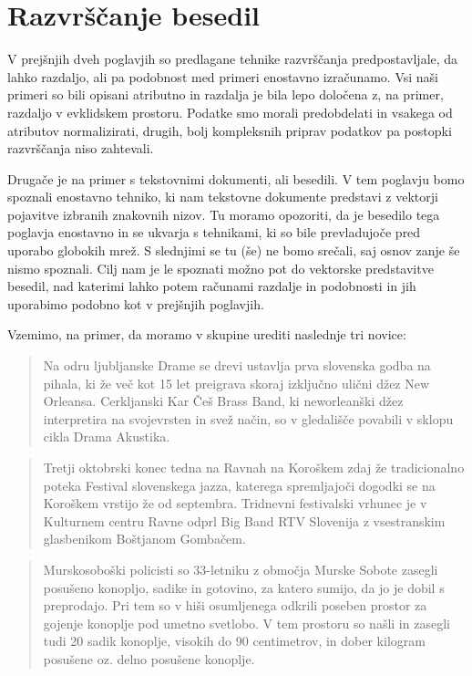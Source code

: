 \chapter{Razvrščanje besedil}

V prejšnjih dveh poglavjih so predlagane tehnike razvrščanja
predpostavljale, da lahko razdaljo, ali pa podobnost med primeri
enostavno izračunamo. Vsi naši primeri so bili opisani atributno in
razdalja je bila lepo določena z, na primer, razdaljo v evklidskem
prostoru. Podatke smo morali predobdelati in vsakega od
atributov normalizirati, drugih, bolj kompleksnih priprav podatkov pa
postopki razvrščanja niso zahtevali.

Drugače je na primer s tekstovnimi dokumenti, ali besedili. V tem poglavju bomo spoznali enostavno tehniko, ki nam tekstovne dokumente predstavi z vektorji pojavitve izbranih znakovnih nizov. Tu moramo opozoriti, da je besedilo tega poglavja enostavno in se ukvarja s tehnikami, ki so bile prevladujoče pred uporabo globokih mrež. S slednjimi se tu (še) ne bomo srečali, saj osnov zanje še nismo spoznali. Cilj nam je le spoznati možno pot do vektorske predstavitve besedil, nad katerimi lahko potem računami razdalje in podobnosti in jih uporabimo podobno kot v prejšnjih poglavjih.

Vzemimo, na primer, da moramo v skupine urediti naslednje tri novice:

{\small
\begin{quotation}
Na odru ljubljanske Drame se drevi ustavlja prva slovenska godba na pihala, ki že več kot 15 let preigrava skoraj izključno ulični džez New Orleansa. Cerkljanski Kar Češ Brass Band, ki neworleanški džez interpretira na svojevrsten in svež način, so v gledališče povabili v sklopu cikla Drama Akustika.
\end{quotation}

\begin{quotation}
Tretji oktobrski konec tedna na Ravnah na Koroškem zdaj že tradicionalno poteka Festival slovenskega jazza, katerega spremljajoči dogodki se na Koroškem vrstijo že od septembra. Tridnevni festivalski vrhunec je v Kulturnem centru Ravne odprl Big Band RTV Slovenija z vsestranskim glasbenikom Boštjanom Gombačem.
\end{quotation}

\begin{quotation}
Murskosoboški policisti so 33-letniku z območja Murske Sobote zasegli
posušeno konopljo, sadike in gotovino, za katero sumijo, da jo je
dobil s preprodajo. Pri tem so v hiši osumljenega odkrili poseben
prostor za gojenje konoplje pod umetno svetlobo. V tem prostoru so
našli in zasegli tudi 20 sadik konoplje, visokih do 90 centimetrov, in
dober kilogram posušene oz. delno posušene konoplje.
\end{quotation}
}

